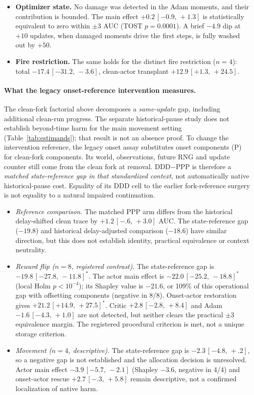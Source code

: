 \documentclass[10pt]{article} %
\newcommand{\sig}{^{\ast}}
\newcommand{\ci}[2]{\,[#1,\,#2]}
\begin{document}
\begin{itemize}
\item \textbf{Optimizer state.} No damage was detected in the Adam moments, and their contribution is bounded. The main effect $+0.2\ci{-0.9}{+1.3}$ is statistically equivalent to zero within $\pm3$ AUC (TOST $p=0.0001$). A brief $-4.9$ dip at $+10$ updates, when damaged moments drive the first steps, is fully washed out by $+50$.
\item \textbf{Fire restriction.} The same holds for the distinct fire restriction ($n=4$): total $-17.4\ci{-31.2}{-3.6}$, clean-actor transplant $+12.9\ci{+1.3}{+24.5}$.
\end{itemize}

\paragraph{What the legacy onset-reference intervention measures.}
The clean-fork factorial above decomposes a \emph{same-update} gap, including additional clean-run progress. The separate historical-pause study does not establish beyond-time harm for the main movement setting (Table~\ref{tab:estimands}); that result is not an absence proof. To change the intervention reference, the legacy onset assay substitutes onset components (P) for clean-fork components. Its world, observations, future RNG and update counter still come from the clean fork at removal. DDD$-$PPP is therefore a \emph{matched state-reference gap in that standardized context}, not automatically native historical-pause cost. Equality of its DDD cell to the earlier fork-reference surgery is not equality to a natural impaired continuation.
\begin{itemize}
\item \emph{Reference comparison.} The matched PPP arm differs from the historical delay-shifted clean trace by $+1.2\ci{-.6}{+3.0}$ AUC. The state-reference gap ($-19.8$) and historical delay-adjusted comparison ($-18.6$) have similar direction, but this does not establish identity, practical equivalence or context neutrality.
\item \emph{Reward flip ($n=8$, registered contrast).} The state-reference gap is $-19.8\ci{-27.8}{-11.8}\sig$. The actor main effect is $-22.0\ci{-25.2}{-18.8}\sig$ (local Holm $p<10^{-4}$); its Shapley value is $-21.6$, or 109\% of this operational gap with offsetting components (negative in 8/8). Onset-actor restoration gives $+21.2\ci{+14.9}{+27.5}\sig$. Critic $+2.8\ci{-2.8}{+8.4}$ and Adam $-1.6\ci{-4.3}{+1.0}$ are not detected, but neither clears the practical $\pm3$ equivalence margin. The registered procedural criterion is met, not a unique storage criterion.
\item \emph{Movement ($n=4$, descriptive).} The state-reference gap is $-2.3\ci{-4.8}{+.2}$, so a negative gap is not established and the allocation decision is unresolved. Actor main effect $-3.9\ci{-5.7}{-2.1}$ (Shapley $-3.6$, negative in 4/4) and onset-actor rescue $+2.7\ci{-.3}{+5.8}$ remain descriptive, not a confirmed localization of native harm.
\end{itemize}
\end{document}

